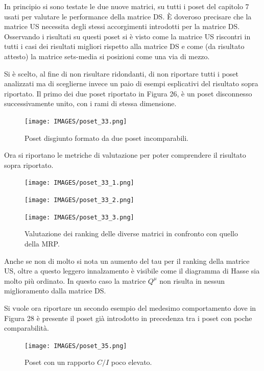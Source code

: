 \documentclass{report}
\begin{document}
In principio si sono testate le due nuove matrici, su tutti i poset del capitolo 7 usati per valutare le performance della matrice DS. È doveroso precisare che la matrice US necessita degli stessi accorgimenti introdotti per la matrice DS. Osservando i risultati su questi poset si è visto come la matrice US riscontri in tutti i casi dei risultati migliori rispetto alla matrice DS e come (da risultato attesto) la matrice sets-media si posizioni come una via di mezzo.


Si è scelto, al fine di non risultare ridondanti, di non riportare tutti i poset analizzati ma di sceglierne invece un paio di esempi esplicativi del risultato sopra riportato.
Il primo dei due poset riportato in Figura 26, è un poset disconnesso successivamente unito, con i rami di stessa dimensione.

\begin{figure}[H]
    \centering
    \texttt{[image: IMAGES/poset\_33.png]}
    \caption{Poset disgiunto formato da due poset incomparabili.}
    \label{fig:roc}
\end{figure}

Ora si riportano le metriche di valutazione per poter comprendere il risultato sopra riportato.
\begin{figure}[H]
  \centering
  \begin{minipage}[b]{0.4\textwidth}
    \texttt{[image: IMAGES/poset\_33\_1.png]}
  \end{minipage}
  \hfill
  \begin{minipage}[b]{0.4\textwidth}
    \texttt{[image: IMAGES/poset\_33\_2.png]}
  \end{minipage}
  \hfill
  \begin{minipage}[b]{0.4\textwidth}
    \texttt{[image: IMAGES/poset\_33\_3.png]}
  \end{minipage}
  \caption{Valutazione dei ranking delle diverse matrici in confronto con quello della MRP.}
\end{figure}

Anche se non di molto si nota un aumento del tau per il ranking della matrice US, oltre a questo leggero innalzamento è visibile come il diagramma di Hasse sia molto più ordinato. In questo caso la matrice $Q^{\mu}$ non risulta in nessun miglioramento dalla matrice DS.


Si vuole ora riportare un secondo esempio del medesimo comportamento dove in Figura 28 è presente il poset già introdotto in precedenza tra i poset con poche comparabilità.

\begin{figure}[H]
    \centering
    \texttt{[image: IMAGES/poset\_35.png]}
    \caption{Poset con un rapporto $C/I$ poco elevato.}
    \label{fig:roc}
\end{figure}
\end{document}

